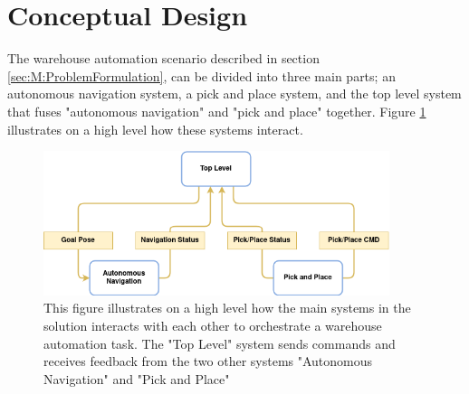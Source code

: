 

\section{Conceptual Design}\label{sec:M:ConceptualDesign}
The warehouse automation scenario described in section \ref{sec:M:ProblemFormulation}, can be divided into three main parts; an autonomous navigation system, a pick and place system, and the top level system that fuses "autonomous navigation" and "pick and place" together. Figure \ref{fig:M:CD:topLevelMethod} illustrates on a high level how these systems interact.

\begin{figure}[htp]
    \centering
    \includegraphics[width = 0.9\textwidth]{Figures/figTopLevelMethod.drawio.png}
    \caption{This figure illustrates on a high level how the main systems in the solution interacts with each other to orchestrate a warehouse automation task. The "Top Level" system sends commands and receives feedback from the two other systems "Autonomous Navigation" and "Pick and Place"}
    \label{fig:M:CD:topLevelMethod}
\end{figure}

